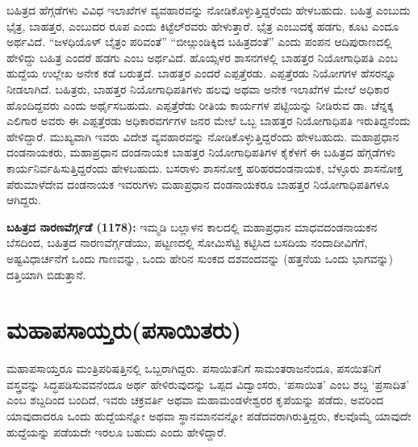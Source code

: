 ಬಹಿತ್ರದ ಹೆಗ್ಗಡೆಗಳು ವಿವಿಧ ಇಲಾಖೆಗಳ ವ್ಯವಹಾರವನ್ನು ನೋಡಿಕೊಳ್ಳುತ್ತಿದ್ದರೆಂದು ಹೇಳಬಹುದು. ಬಹಿತ್ರ ಎಂಬುದು ಭೈತ್ರ, ಬಾಹತ್ತರ, ಎಂಬುದರ ರೂಪ ಎಂದು ಕಿಟ್ಟೆಲ್​ರವರು ಹೇಳುತ್ತಾರೆ. ಭೈತ್ರ ಎಂಬುದಕ್ಕೆ ಹಡಗು, ಕೂಟ ಎಂದೂ ಅರ್ಥವಿದೆ. “ಜಳಧಿಯೊಳ್​ ಬೈತ್ರಂ ಪರಿವಂತೆ” “ಬೀೞ್ಗುಂಡಿಕ್ಕಿದ ಬಹಿತ್ರದಂತೆ” ಎಂದು ಪಂಪನ ಆದಿಪುರಾಣದಲ್ಲಿ ಹೇಳಿದ್ದು ಬಹಿತ್ರ ಎಂದರೆ ಹಡಗು ಎಂಬ ಅರ್ಥವಿದೆ. ಹೊಯ್ಸಳರ ಶಾಸನಗಳಲ್ಲಿ ಬಾಹತ್ತರ ನಿಯೋಗಾಧಿಪತಿ ಎಂಬ ಹುದ್ದೆಯ ಉಲ್ಲೇಖ ಅನೇಕ ಕಡೆ ಬರುತ್ತದೆ. ಬಾಹತ್ತರ ಎಂದರೆ ಎಪ್ಪತ್ತೆರಡು. ಎಪ್ಪತ್ತೆರಡು ನಿಯೋಗಗಳ ಹೆಸರನ್ನೂ ನೀಡಲಾಗಿದೆ. ಬಹಿತ್ರರು, ಬಾಹತ್ತರ ನಿಯೋಗಾಧಿಪತಿಗಳು ಹಲವು ಅಥವಾ ಅನೇಕ ಇಲಾಖೆಗಳ ಮೇಲೆ ಅಧಿಕಾರ ಹೊಂದಿದ್ದವರು ಎಂದು ಅರ್ಥೈಸಬಹುದು. ಎಪ್ಪತ್ತೆರೆಡು ರೀತಿಯ ಕಾರ್ಯಗಳ ಪಟ್ಟಿಯನ್ನು ನೀಡಿರುವ ಡಾ. ಚೆನ್ನಕ್ಕ ಎಲಿಗಾರ ಅವರು ಈ ಎಪ್ಪತ್ತೆರಡು ಅಧಿಕಾರವರ್ಗಗಳ ಜನರ ಮೇಲೆ ಒಬ್ಬ ಬಾಹತ್ತರ ನಿಯೋಗಾಧಿಪತಿ ಇರುತಿದ್ದನೆಂದು ಹೇಳಿದ್ದಾರೆ. ಮುಖ್ಯವಾಗಿ ಇವರು ವಿದೇಶ ವ್ಯವಹಾರವನ್ನು ನೋಡಿಕೊಳ್ಳುತ್ತಿದ್ದರೆಂದು ಹೇಳಬಹುದು. ಮಹಾಪ್ರಧಾನ ದಂಡನಾಯಕರು, ಮಹಾಪ್ರಧಾನ ದಂಡನಾಯಕ ಬಾಹತ್ತರ ನಿಯೋಗಾಧಿಪತಿಗಳ ಕೈಕೆಳಗೆ ಈ ಬಹಿತ್ರದ ಹೆಗ್ಗಡೆಗಳು ಕಾರ್ಯನಿರ್ವಹಿಸುತ್ತಿದ್ದರೆಂದು ಹೇಳಬಹುದು. ಬಸರಾಳು ಶಾಸನೋಕ್ತ ಹರಿಹರದಂಡನಾಯಕ, ಬೆಳ್ಳೂರು ಶಾಸನೋಕ್ತ ಪೆರುಮಾಳೆದೇವ ದಂಡನಾಯಕ ಇವರುಗಳು ಮಹಾಪ್ರಧಾನ ದಂಡನಾಯಕರೂ ಬಾಹತ್ತರ ನಿಯೋಗಾಧಿಪತಿಗಳೂ ಆಗಿದ್ದರು.

\textbf{ಬಹಿತ್ರದ ನಾರಣವೆರ್ಗ್ಗಡೆ (1178):} ಇಮ್ಮಡಿ ಬಲ್ಲಾಳನ ಕಾಲದಲ್ಲಿ ಮಹಾಪ್ರಧಾನ ಮಾಧವದಂಡನಾಯಕನ ಬೆಸದಿಂದ, ಬಹಿತ್ರದ ನಾರಣವೆರ್ಗ್ಗಡೆಯು, ಪಟ್ಟಣದಲ್ಲಿ ಸೋಮಿಸೆಟ್ಟಿ ಕಟ್ಟಿಸಿದ ಬಸದಿಯ ನಂದಾದೀವಿಗೆಗೆ, ಅಷ್ಟ\-ವಿಧಾರ್ಚನೆಗೆ ಒಂದು ಗಾಣವನ್ನು, ಒಂದು ಹೇರಿನ ಸುಂಕದ ದಶವಂದವನ್ನು (ಹತ್ತನೆಯ ಒಂದು ಭಾಗವನ್ನು) ದತ್ತಿಯಾಗಿ ಬಿಡುತ್ತಾನೆ.


\section{ಮಹಾಪಸಾಯ್ತರು(ಪಸಾಯಿತರು)}

ಮಹಾಪಸಾಯ್ತರೂ ಮಂತ್ರಿಪರಿಷತ್ತಿನಲ್ಲಿ ಒಬ್ಬರಾಗಿದ್ದರು. ಪಸಾಯಿತನಿಗೆ ಸಾಮಂತರಾಜನೆಂದೂ, ಪಸಯಿತನಿಗೆ ವಸ್ತ್ರವನ್ನು ಸಿದ್ಧಪಡಿಸುವವನೆಂದೂ ಅರ್ಥ ಹೇಳಿರುವುದನ್ನು ಒಪ್ಪದ ವಿದ್ವಾಂಸರು, ‘ಪಸಾಯಿತ’ ಎಂಬ ಶಬ್ದ ‘ಪ್ರಸಾದಿತ’ ಎಂಬ ಶಬ್ದದಿಂದ ಬಂದಿದೆ, ಇವರು ಚಕ್ರವರ್ತಿ ಅಥವಾ ಮಹಾಮಂಡಳೇಶ್ವರರ ಕೃಪೆಯನ್ನು ಪಡೆದು, ಅವರಿಂದ ಯಾವುದಾದರೂ ಒಂದು ಹುದ್ದೆಯನ್ನೋ ಅಥವಾ ಸ್ಥಾನಮಾನವನ್ನೋ ಪಡೆದವರಾಗಿರುತ್ತಿದ್ದರು, ಕೆಲವೊಮ್ಮೆ ಯಾವುದೇ ಹುದ್ದೆಯನ್ನು ಪಡೆಯದೇ \hbox{ಇರಲೂ} ಬಹುದು ಎಂದು ಹೇಳಿದ್ದಾರೆ.


